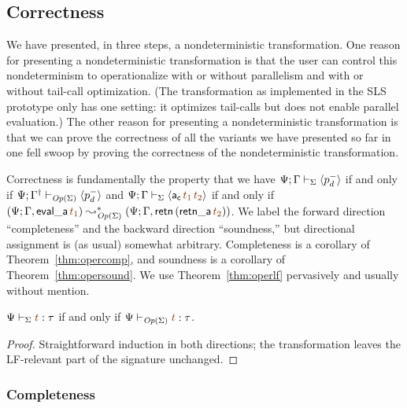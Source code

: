\subsection{Correctness}
\label{sec:operationalization-correct}

We have presented, in three steps, a nondeterministic transformation.
One reason for presenting a nondeterministic transformation is that
the user can control this nondeterminism to operationalize with or
without parallelism and with or without tail-call optimization. (The
transformation as implemented in the SLS prototype only has one
setting: it optimizes tail-calls but does not enable parallel
evaluation.) The other reason for presenting a nondeterministic
transformation is that we can prove the correctness of all the
variants we have presented so far in one fell swoop by proving the
correctness of the nondeterministic transformation.

Correctness is fundamentally the property that
we have ${\Psi}; {\Gamma} \vdash_{\Sigma} {\langle {p^-_d} \rangle}$ if and only if 
${\Psi}; {{{\Gamma}^\dag}} \vdash_{{\it Op}({\Sigma})} {\langle {p^-_d} \rangle}$
and $\slss{\Sigma}{\Psi}{\Gamma}{\susp{{\sf a_c}\,\lf{t_1}\,\lf{t_2}}}$ if and only if
$(\Psi; \mkconj{\Gamma}{{\sf eval\_a}\,\lf{t_1}}) \leadsto^*_{\transop{\Sigma}} (\Psi; \mkconj{\Gamma}{{\sf retn}\,({\sf retn\_a}\,\lf{t_2})})$. We label the
forward direction ``completeness'' and the backward direction ``soundness,''
but directional assignment is (as usual) somewhat arbitrary. 
Completeness is a corollary
of Theorem~\ref{thm:opercomp}, and soundness is a corollary of 
Theorem~\ref{thm:opersound}. We use Theorem~\ref{thm:operlf} pervasively
and usually without mention. 

\bigskip
\begin{theorem}\label{thm:operlf}
  $\Psi \vdash_\Sigma \lf{t} : \tau$ if and only if $\Psi
  \vdash_{\transop{\Sigma}} \lf{t} : \tau$.
\end{theorem}

\begin{proof}
Straightforward induction in both directions; the transformation 
leaves the LF-relevant part of the signature unchanged.
\end{proof}

\subsubsection{Completeness}

